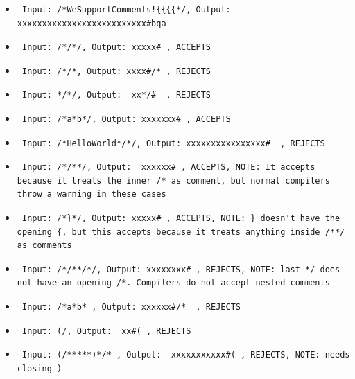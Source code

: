 \documentclass{article}
\begin{document}
\begin{itemize}
    \item \begin{verbatim} Input: /*WeSupportComments!{{{{*/, Output:  xxxxxxxxxxxxxxxxxxxxxxxxxx#bqa \end{verbatim}
    \item \begin{verbatim} Input: /*/*/, Output: xxxxx# , ACCEPTS \end{verbatim}  
    \item \begin{verbatim} Input: /*/*, Output: xxxx#/* , REJECTS \end{verbatim}
    \item \begin{verbatim} Input: */*/, Output:  xx*/#  , REJECTS \end{verbatim}
    \item \begin{verbatim} Input: /*a*b*/, Output: xxxxxxx# , ACCEPTS \end{verbatim}
    \item \begin{verbatim} Input: /*HelloWorld*/*/, Output: xxxxxxxxxxxxxxxx#  , REJECTS \end{verbatim}
    \item \begin{verbatim} Input: /*/**/, Output:  xxxxxx# , ACCEPTS, NOTE: It accepts because it treats the inner /* as comment, but normal compilers throw a warning in these cases \end{verbatim} 
    \item \begin{verbatim} Input: /*}*/, Output: xxxxx# , ACCEPTS, NOTE: } doesn't have the opening {, but this accepts because it treats anything inside /**/ as comments \end{verbatim}
    \item \begin{verbatim} Input: /*/**/*/, Output: xxxxxxxx# , REJECTS, NOTE: last */ does not have an opening /*. Compilers do not accept nested comments \end{verbatim}
    \item \begin{verbatim} Input: /*a*b* , Output: xxxxxx#/*  , REJECTS \end{verbatim}
    \item \begin{verbatim} Input: (/, Output:  xx#( , REJECTS \end{verbatim} 
    \item \begin{verbatim} Input: (/*****)*/* , Output:  xxxxxxxxxxx#( , REJECTS, NOTE: needs closing ) \end{verbatim}

\end{itemize}
\end{document}
